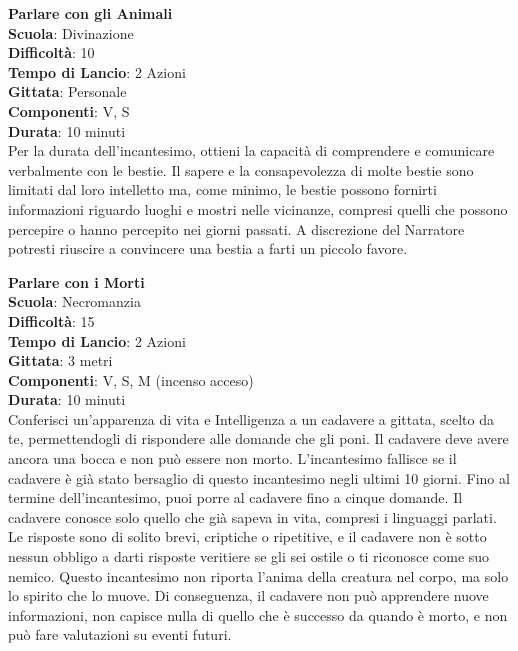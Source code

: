 \begin{multicols}{2}
\medskip\textbf{Parlare con gli Animali}\\
\textbf{Scuola}: Divinazione\\
\textbf{Difficoltà}: 10\\
\textbf{Tempo di Lancio}: 2 Azioni\\
\textbf{Gittata}: Personale\\
\textbf{Componenti}: V, S\\
\textbf{Durata}: 10 minuti\\
Per la durata dell'incantesimo, ottieni la capacità di comprendere e comunicare verbalmente con le bestie. Il sapere e la consapevolezza di molte bestie sono limitati dal loro intelletto ma, come minimo, le bestie possono fornirti informazioni riguardo luoghi e mostri nelle vicinanze, compresi quelli che possono percepire o hanno percepito nei giorni passati. A discrezione del Narratore potresti riuscire a convincere una bestia a farti un piccolo favore.

\medskip\textbf{Parlare con i Morti}\\
\textbf{Scuola}: Necromanzia\\
\textbf{Difficoltà}: 15\\
\textbf{Tempo di Lancio}: 2 Azioni\\
\textbf{Gittata}: 3 metri\\
\textbf{Componenti}: V, S, M (incenso acceso)\\
\textbf{Durata}: 10 minuti\\
Conferisci un'apparenza di vita e Intelligenza a un cadavere a gittata, scelto da te, permettendogli di rispondere alle domande che gli poni. Il cadavere deve avere ancora una bocca e non può essere non morto. L'incantesimo fallisce se il cadavere è già stato bersaglio di questo incantesimo negli ultimi 10 giorni. Fino al termine dell'incantesimo, puoi porre al cadavere fino a cinque domande. Il cadavere conosce solo quello che già sapeva in vita, compresi i linguaggi parlati. Le risposte sono di solito brevi, criptiche o ripetitive, e il cadavere non è sotto nessun obbligo a darti risposte veritiere se gli sei ostile o ti riconosce come suo nemico. Questo incantesimo non riporta l'anima della creatura nel corpo, ma solo lo spirito che lo muove. Di conseguenza, il cadavere non può apprendere nuove informazioni, non capisce nulla di quello che è successo da quando è morto, e non può fare valutazioni su eventi futuri.


\end{multicols}
